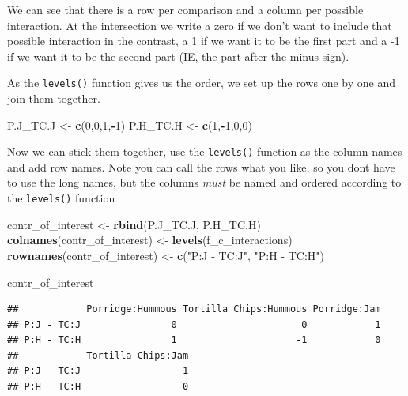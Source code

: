 \documentclass[
]{book}
\newenvironment{Shaded}{\begin{snugshade}}{\end{snugshade}}
\newcommand{\DecValTok}[1]{\textcolor[rgb]{0.00,0.00,0.81}{#1}}
\newcommand{\KeywordTok}[1]{\textcolor[rgb]{0.13,0.29,0.53}{\textbf{#1}}}
\newcommand{\NormalTok}[1]{#1}
\newcommand{\OperatorTok}[1]{\textcolor[rgb]{0.81,0.36,0.00}{\textbf{#1}}}
\newcommand{\StringTok}[1]{\textcolor[rgb]{0.31,0.60,0.02}{#1}}
\begin{document}
We can see that there is a row per comparison and a column per possible interaction. At the intersection we write a zero if we don't want to include that possible interaction in the contrast, a 1 if we want it to be the first part and a -1 if we want it to be the second part (IE, the part after the minus sign).

As the \texttt{levels()} function gives us the order, we set up the rows one by one and join them together.

\begin{Shaded}
\begin{Highlighting}[]
\NormalTok{P.J_TC.J <-}\StringTok{ }\KeywordTok{c}\NormalTok{(}\DecValTok{0}\NormalTok{,}\DecValTok{0}\NormalTok{,}\DecValTok{1}\NormalTok{,}\OperatorTok{-}\DecValTok{1}\NormalTok{)}
\NormalTok{P.H_TC.H <-}\StringTok{ }\KeywordTok{c}\NormalTok{(}\DecValTok{1}\NormalTok{,}\OperatorTok{-}\DecValTok{1}\NormalTok{,}\DecValTok{0}\NormalTok{,}\DecValTok{0}\NormalTok{)}
\end{Highlighting}
\end{Shaded}

Now we can stick them together, use the \texttt{levels()} function as the column names and add row names. Note you can call the rows what you like, so you dont have to use the long names, but the columns \emph{must} be named and ordered according to the \texttt{levels()} function

\begin{Shaded}
\begin{Highlighting}[]
\NormalTok{contr_of_interest <-}\StringTok{ }\KeywordTok{rbind}\NormalTok{(P.J_TC.J, P.H_TC.H)}
\KeywordTok{colnames}\NormalTok{(contr_of_interest) <-}\StringTok{ }\KeywordTok{levels}\NormalTok{(f_c_interactions)}
\KeywordTok{rownames}\NormalTok{(contr_of_interest) <-}\StringTok{ }\KeywordTok{c}\NormalTok{(}\StringTok{"P:J - TC:J"}\NormalTok{,}
          \StringTok{"P:H - TC:H"}\NormalTok{)}

\NormalTok{contr_of_interest}
\end{Highlighting}
\end{Shaded}

\begin{verbatim}
##            Porridge:Hummous Tortilla Chips:Hummous Porridge:Jam
## P:J - TC:J                0                      0            1
## P:H - TC:H                1                     -1            0
##            Tortilla Chips:Jam
## P:J - TC:J                 -1
## P:H - TC:H                  0
\end{verbatim}
\end{document}
